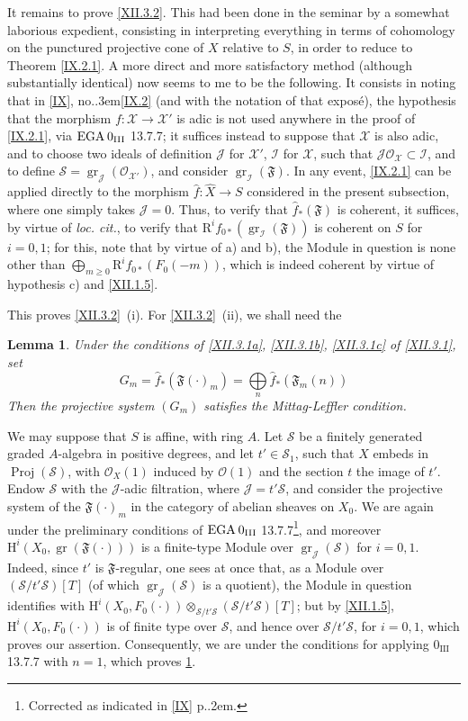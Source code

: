 \documentclass[11pt,a4paper,oneside]{book}
\providecommand{\sisi}[2]{#2}
\providecommand{\pageoriginale}{%
  \refstepcounter{pageoriginal}%
  \marginpar{\raggedright\footnotesize\bfseries\thepageoriginal}%
  \xspace}
\providecommand{\sfootnote}[1]{\footnote{#1}}
\providecommand{\loccit}{\textit{loc. cit.}\xspace}
\providecommand{\EGA}{\textup{EGA}\kern.2em}
\providecommand{\ptbl}{.\kern.2em}
\providecommand{\numero}{no.\kern.3em}
\providecommand{\Ii}{\mathcal I}
\providecommand{\Jj}{\mathcal J}
\providecommand{\Oo}{\mathcal O}
\providecommand{\Ss}{\mathcal S}
\providecommand{\Xx}{\mathcal X}
\providecommand{\formelF}{\mathfrak F}
\DeclareMathOperator{\Proj}{Proj}
\DeclareMathOperator{\SheafProj}{\mathbf{Proj}}
\DeclareMathOperator{\gr}{gr}
\providecommand{\OX}{\mathcal O_X}
\renewcommand{\H}{\mathrm H}
\providecommand{\R}{\mathrm R}
\providecommand{\tbigoplus}{\mathop{\textstyle\bigoplus}\limits}
\let\pageoriginaled\pageoriginale
\theoremstyle{plain}
\newtheorem{lemme}[subsection]{Lemma}
\theoremstyle{definition}
\theoremstyle{remark}
\renewcommand{\Ref}[1]{\textup{\ref{#1}}}
\begin{document}
It remains to prove \Ref{XII.3.2}. This had been done in the
seminar by a somewhat laborious expedient, consisting in interpreting
everything in terms of cohomology on the punctured projective cone
of $X$ relative to $S$, in order to reduce to
Theorem \Ref{IX.2.1}. A more direct and more
satisfactory method (although substantially identical) now seems to me
to be the following. It consists in noting that in \Ref{IX},
\numero \Ref{IX.2}\label{XII.14} (and with the
notation of that expos\'e), the hypothesis that the morphism
$f:\Xx\to\Xx'$ is adic is not used anywhere in the
proof of \Ref{IX.2.1}, via $\EGA 0_{\textup{III}}$ 13.7.7;
it suffices instead to suppose that $\Xx$ is also adic,
and to choose two ideals of definition $\Jj$ for $\Xx'$, $\Ii$
for $\Xx$, such that $\Jj\Oo_\Xx\subset\Ii$, and to define
$\Ss=\gr_\Jj(\Oo_{\Xx'})$, and consider $\gr_\Ii(\formelF)$. In
any event, \Ref{IX.2.1} can be applied directly to the
morphism $\widehat{f}:\widehat{X}\to S$ considered in the present
subsection, where one simply takes $\Jj=0$. Thus, to verify that
$\widehat{f}_\ast(\formelF)$ is coherent, it suffices, by virtue of
\loccit, to verify that $\R^if_{0\ast}(\gr_\Ii(\formelF))$ is
coherent on $S$ for $i=0, 1$; for this, note that by virtue of
a) and b), the Module in question is none other than
$\sisi{\coprod}{\bigoplus}_{m\geq 0}\R^if_{0\ast}(F_0(-m))$, which
is indeed coherent by virtue of hypothesis c) and
\Ref{XII.1.5}.

This proves \Ref{XII.3.2}~(i). For \Ref{XII.3.2}~(ii), we shall need the

\begin{lemme} \label{XII.3.3}
Under\pageoriginaled the conditions of \Ref{XII.3.1a}, \Ref{XII.3.1b}, \Ref{XII.3.1c} of \Ref{XII.3.1}, set
\[
G_m= \widehat{f}_\ast(\formelF(\cdot)_m) = \sisi{\coprod}{\tbigoplus}_n\widehat{f}_\ast(\formelF_m(n))
\]
Then the projective system $(G_m)$ satisfies the Mittag-Leffler condition.
\end{lemme}

We may suppose that $S$ is affine, with ring $A$. Let $\Ss$ be a finitely generated graded $A$-algebra in positive degrees, and let $t'\in\Ss_1$, such that $X$ embeds in $\Proj(\Ss)$, with $\OX(1)$ induced by \sisi{$\SheafProj(\Ss(1))$}{$\Oo(1)$} and the section $t$ the image of $t'$. Endow $\Ss$ with the $\Jj$-adic filtration, where $\Jj=t'\Ss$, and consider the projective system of the $\formelF(\cdot)_m$ in the category of abelian sheaves on $X_0$. We are again under the preliminary conditions of $\EGA 0_{\textup{III}}$ 13.7.7\sfootnote{Corrected as indicated in \Ref{IX} p\ptbl\sisi{11}{\pageref{pagerectif}.}}, and moreover $\H^i(X_0, \gr(\formelF(\cdot))\sisi{}{)}$ is a finite-type Module over $\gr_\Jj(\Ss)$ for $i=0, 1$. Indeed, since $t'$ is $\formelF$-regular, one sees at once that, as a Module over $(\Ss /t'\Ss)[T]$ (of which $\gr_\Jj(\Ss)$ is a quotient), the Module in question identifies with $\H^i(X_0, F_0(\cdot))\otimes_{\Ss /t'\Ss}(\Ss /t'\Ss)[T]$; but by \Ref{XII.1.5}, $\H^i(X_0, F_0(\cdot))$ is of finite type over $\Ss$, and hence over $\Ss /t'\Ss$, for $i=0, 1$, which proves our assertion. Consequently, we are under the conditions for applying $0_{\text{III}}$ 13.7.7 with $n=1$, which proves \Ref{XII.3.3}.
\end{document}
